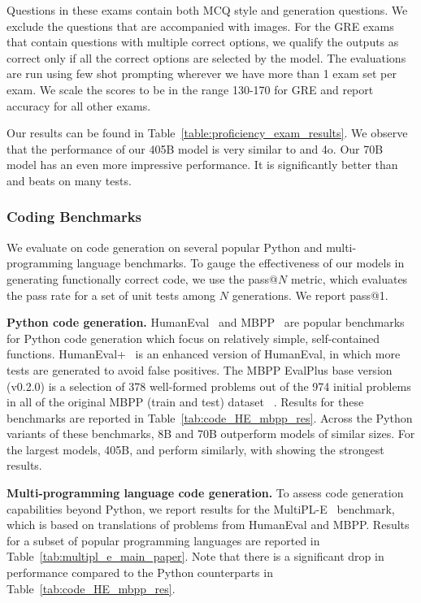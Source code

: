 Questions in these exams contain both MCQ style and generation questions.
We exclude the questions that are accompanied with images.
For the GRE exams that contain questions with multiple correct options, we qualify the outputs as correct only if all the correct options are selected by the model.
The evaluations are run using few shot prompting wherever we have more than 1 exam set per exam. We scale the scores to be in the range 130-170 for GRE and report accuracy for all other exams.

Our results can be found in Table~\ref{table:proficiency_exam_results}. We observe that the performance of our \llamathree 405B model is very similar to \sonnet and \gpt4o. Our 70B model has an even more impressive performance. It is significantly better than \gptthreedotfivet and beats \nemotron on many tests.


\subsubsection{Coding Benchmarks}
\label{subsubsec:code_evals}
We evaluate \llamathree on code generation on several popular Python and multi-programming language benchmarks.
To gauge the effectiveness of our models in generating functionally correct code, we use the pass@$N$ metric, which evaluates the pass rate for a set of unit tests among $N$ generations. We report pass@1.

\textbf{Python code generation.} HumanEval~\citep{chen2021evaluating} and  MBPP~\citep{austin2021program} are popular benchmarks for Python code generation which focus on relatively simple, self-contained functions.
HumanEval+~\citep{liu2024your} is an enhanced version of HumanEval, in which more tests are generated to avoid false positives. The MBPP EvalPlus base version (v0.2.0) is a selection of 378 well-formed problems out of the 974 initial problems in all of the original MBPP (train and test) dataset ~\citep{liu2024your}.
Results for these benchmarks are reported in Table~\ref{tab:code_HE_mbpp_res}.
Across the Python variants of these benchmarks, \llamathree 8B and 70B outperform models of similar sizes. For the largest models, \llamathree 405B, \sonnet and \gpto perform similarly, with \gpto showing the strongest results. %

\textbf{Multi-programming language code generation.} To assess code generation capabilities beyond Python, we report results for the MultiPL-E~\citep{cassano2022multiple} benchmark, which is based on translations of problems from HumanEval and MBPP.
Results for a subset of popular programming languages are reported in Table~\ref{tab:multipl_e_main_paper}. Note that there is a significant drop in performance compared to the Python counterparts in Table~\ref{tab:code_HE_mbpp_res}.

